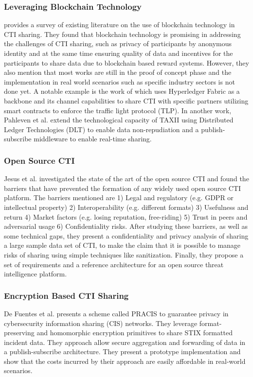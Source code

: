 \subsubsection{Leveraging Blockchain Technology}
\cite{el-kosairy_survey_2023} provides a survey of existing literature on the use of blockchain technology in CTI sharing. They found that blockchain technology is promising in addressing the challenges of CTI sharing, such as privacy of participants by anonymous identity and at the same time ensuring quality of data and incentives for the participants to share data due to blockchain based reward systems. However, they also mention that most works are still in the proof of concept phase and the implementation in real world scenarios such as specific industry sectors is not done yet. A notable example is the work of \cite{homan_new_2019} which uses Hyperledger Fabric as a backbone and its channel capabilities to share CTI with specific partners utilizing smart contracts to enforce the traffic light protocol (TLP). In another work, Pahleven et al. \cite{pahlevan_secure_2021} extend the technological capacity of TAXII using Distributed Ledger Technologies (DLT) to enable data non-repudiation and a publish-subscribe middleware to enable real-time sharing.
\subsubsection{Open Source CTI} Jesus et al. \cite{jesus_sharing_2023} investigated the state of the art of the open source CTI and found the barriers that have prevented the formation of any widely used open source CTI platform. 
The barriers mentioned are 1) Legal and regulatory (e.g. GDPR or intellectual property) 2) Interoperability (e.g. different formats) 3) Usefulness and return 4) Market factors (e.g. losing reputation, free-riding) 5) Trust in peers and adversarial usage 6) Confidentiality risks. After studying these barriers, as well as some technical gaps, they present a confidentiality and privacy analysis of sharing a large sample data set of CTI, to make the claim that it is possible to manage risks of sharing using simple techniques like sanitization. Finally, they propose a set of requirements and a reference architecture for an open source threat intelligence platform. 
\subsubsection{Encryption Based CTI Sharing} De Fuentes et al. \cite{de_fuentes_pracis_2017} presents a scheme called PRACIS to guarantee privacy in cybersecurity information sharing (CIS) networks. They leverage format-preserving and homomorphic encryption primitives to share STIX formatted incident data. They approach allow secure aggregation and forwarding of data in a publish-subscribe architecture. They present a prototype implementation and show that the costs incurred by their approach are easily affordable in real-world scenarios.
